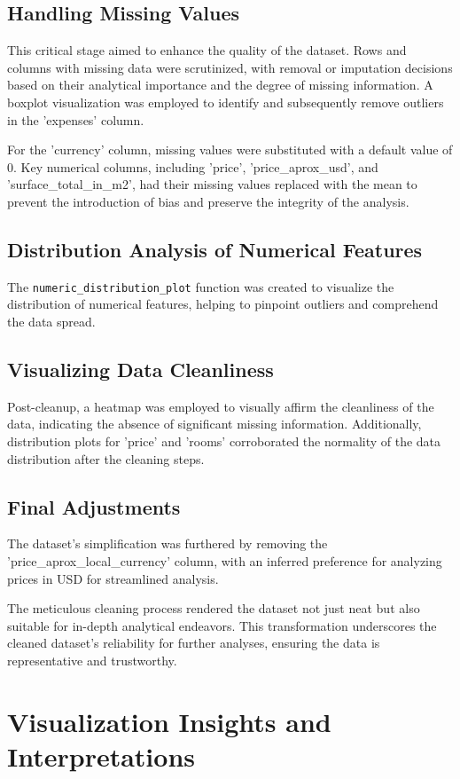 \documentclass{article}
\begin{document}
\subsection{Handling Missing Values}
This critical stage aimed to enhance the quality of the dataset. Rows and columns with missing data were scrutinized, with removal or imputation decisions based on their analytical importance and the degree of missing information. A boxplot visualization was employed to identify and subsequently remove outliers in the 'expenses' column.

For the 'currency' column, missing values were substituted with a default value of 0. Key numerical columns, including 'price', 'price\_aprox\_usd', and 'surface\_total\_in\_m2', had their missing values replaced with the mean to prevent the introduction of bias and preserve the integrity of the analysis.

\subsection{Distribution Analysis of Numerical Features}
The \texttt{numeric\_distribution\_plot} function was created to visualize the distribution of numerical features, helping to pinpoint outliers and comprehend the data spread.

\subsection{Visualizing Data Cleanliness}
Post-cleanup, a heatmap was employed to visually affirm the cleanliness of the data, indicating the absence of significant missing information. Additionally, distribution plots for 'price' and 'rooms' corroborated the normality of the data distribution after the cleaning steps.

\subsection{Final Adjustments}
The dataset's simplification was furthered by removing the 'price\_aprox\_local\_currency' column, with an inferred preference for analyzing prices in USD for streamlined analysis.

The meticulous cleaning process rendered the dataset not just neat but also suitable for in-depth analytical endeavors. This transformation underscores the cleaned dataset's reliability for further analyses, ensuring the data is representative and trustworthy.

\section{Visualization Insights and Interpretations}
\end{document}
